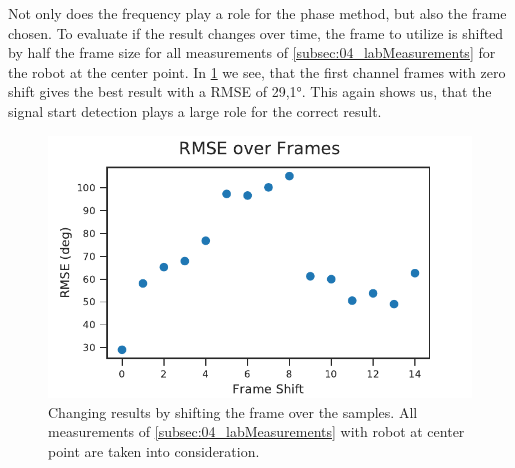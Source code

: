 Not only does the frequency play a role for the phase method,
but also the frame chosen.
To evaluate if the result changes over time, the frame to
utilize is shifted by half the frame size for all measurements
of \cref{subsec:04_labMeasurements} for the robot at the center
point.
In \cref{fig:04_phaseOverTime} we see, that the first channel frames
with zero shift gives the best result with a \ac{RMSE} of 29,1\si{\degree}.
This again shows us, that the signal start detection plays a
large role for the correct result.
\begin{figure}[ht]
	\centering
		\includegraphics[]{figures/evaluation/phase_over_time}
	\caption{Changing results by shifting the frame over the
	samples. All measurements of \cref{subsec:04_labMeasurements}
	with robot at center point are taken into consideration.}
	\label{fig:04_phaseOverTime}
\end{figure}
